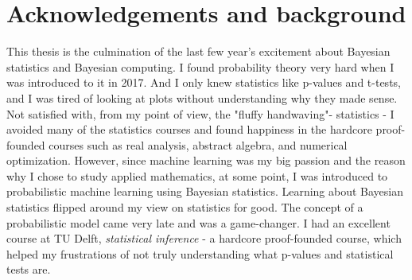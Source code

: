 \section*{Acknowledgements and background}

This thesis is the culmination of the last few year's excitement about Bayesian statistics and Bayesian
computing. I found probability theory very hard when I was introduced to it in 2017. And I only knew
statistics like p-values and t-tests, and I was tired of looking at plots without understanding
why they made sense. Not satisfied with, from my point of view, the "fluffy handwaving"- statistics - I
avoided many of the statistics courses and found happiness in the hardcore proof-founded courses such as
real analysis, abstract algebra, and numerical optimization. However, since machine learning was my big
passion and the reason why I chose to study applied mathematics, at some point, I was introduced to
probabilistic machine learning using Bayesian statistics. Learning about Bayesian statistics
flipped around my view on statistics for good. The concept of a probabilistic model came very late and
was a game-changer. I had an excellent course at TU Delft, \textit{statistical inference} - a hardcore
proof-founded course, which helped my frustrations of not truly understanding what p-values and
statistical tests are.



